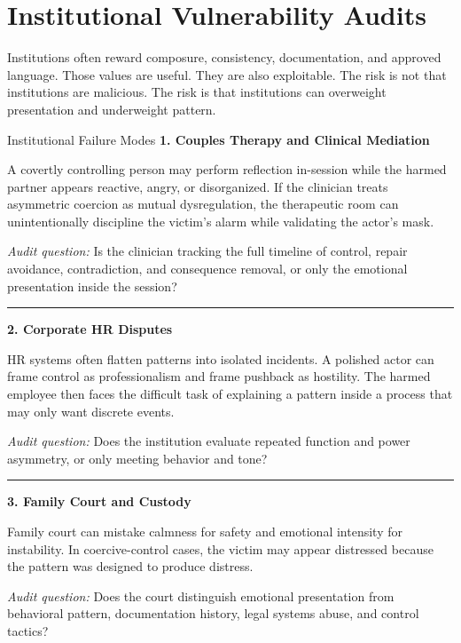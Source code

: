 \documentclass[11pt, letterpaper]{article}
\newcommand{\term}[1]{\textbf{#1}}
\begin{document}
\section{Institutional Vulnerability Audits}

Institutions often reward composure, consistency, documentation, and approved language. Those values are useful. They are also exploitable. The risk is not that institutions are malicious. The risk is that institutions can overweight presentation and underweight pattern.

\begin{frameworkbox}{Institutional Failure Modes}
\small
\term{1. Couples Therapy and Clinical Mediation}

A covertly controlling person may perform reflection in-session while the harmed partner appears reactive, angry, or disorganized. If the clinician treats asymmetric coercion as mutual dysregulation, the therapeutic room can unintentionally discipline the victim's alarm while validating the actor's mask.

\textit{Audit question:} Is the clinician tracking the full timeline of control, repair avoidance, contradiction, and consequence removal, or only the emotional presentation inside the session?

\vspace{0.5em}\hrule\vspace{0.7em}

\term{2. Corporate HR Disputes}

HR systems often flatten patterns into isolated incidents. A polished actor can frame control as professionalism and frame pushback as hostility. The harmed employee then faces the difficult task of explaining a pattern inside a process that may only want discrete events.

\textit{Audit question:} Does the institution evaluate repeated function and power asymmetry, or only meeting behavior and tone?

\vspace{0.5em}\hrule\vspace{0.7em}

\term{3. Family Court and Custody}

Family court can mistake calmness for safety and emotional intensity for instability. In coercive-control cases, the victim may appear distressed because the pattern was designed to produce distress.

\textit{Audit question:} Does the court distinguish emotional presentation from behavioral pattern, documentation history, legal systems abuse, and control tactics?


\end{frameworkbox}
\end{document}
